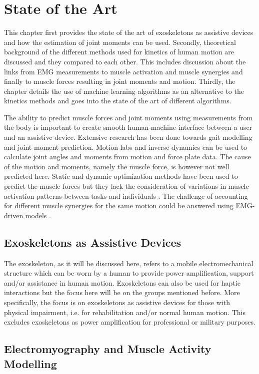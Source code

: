 \section{State of the Art}
This chapter first provides the state of the art of exoskeletons as assistive devices and how the estimation of joint moments can be used. 
Secondly, theoretical background of the different methods used for kinetics of human motion are discussed and they compared to each other.
This includes discussion about the links from EMG measurements to muscle activation and muscle synergies and finally to muscle forces resulting in joint moments and motion.
Thirdly, the chapter details the use of machine learning algorithms as an alternative to the kinetics methods and goes into the state of the art of different algorithms.

The ability to predict muscle forces and joint moments using measurements from the body is important to create smooth human-machine interface between a user and an assistive device.
Extensive research has been done towards gait modelling and joint moment prediction. 
Motion labs and inverse dynamics can be used to calculate joint angles and moments from motion and force plate data. 
The cause of the motion and moments, namely the muscle force, is however not well predicted here. 
Static and dynamic optimization methods have been used to predict the muscle forces but they lack the consideration of variations in muscle activation patterns between tasks and individuals \cite{Pizzolato2015, Sartori2012a}. 
The challenge of accounting for different muscle synergies for the same motion could be answered using EMG-driven models \cite{Pizzolato2015, Sartori2012a}.

\subsection{Exoskeletons as Assistive Devices}
The exoskeleton, as it will be discussed here, refers to a mobile electromechanical structure which can be worn by a human to provide power amplification, support and/or assistance in human motion. Exoskeletons can also be used for haptic interactions but the focus here will be on the groups mentioned before. More specifically, the focus is on exoskeletons as assistive devices for those with physical impairment, i.e. for rehabilitation and/or normal human motion. This excludes exoskeletons as power amplification for professional or military purposes.

\subsection{Electromyography and Muscle Activity Modelling}
\sub

